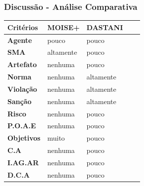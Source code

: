 \documentclass{beamer}
\begin{document}
\begin{frame}
	\frametitle{Discussão - Análise Comparativa}
	\begin{table}[H]
	    \centering
	    \begin{tabular}{|l|l|l|l|l|}
	        \hline
	        \textbf{Critérios} & \textbf{MOISE+}        & \textbf{DASTANI}	\\ \hline
	        \textbf{Agente}    & pouco                  & pouco             \\ \hline
	        \textbf{SMA}       & altamente              & pouco             \\ \hline
	        \textbf{Artefato}  & nenhuma                & pouco             \\ \hline
	        \textbf{Norma}     & nenhuma                & altamente			\\ \hline
	        \textbf{Violação}  & nenhuma                & altamente         \\ \hline
	        \textbf{Sanção}    & nenhuma                & altamente         \\ \hline
	        \textbf{Risco}     & nenhuma                & pouco             \\ \hline
	        \textbf{P.O.A.E}   & nenhuma                & pouco             \\ \hline
	        \textbf{Objetivos} & muito                  & pouco             \\ \hline
	        \textbf{C.A}       & nenhuma                & pouco             \\ \hline
	        \textbf{I.AG.AR}   & nenhuma                & pouco             \\ \hline
	        \textbf{D.C.A}     & nenhuma                & pouco				\\ \hline
	    \end{tabular}
	\end{table}	
\end{frame}
\end{document}
